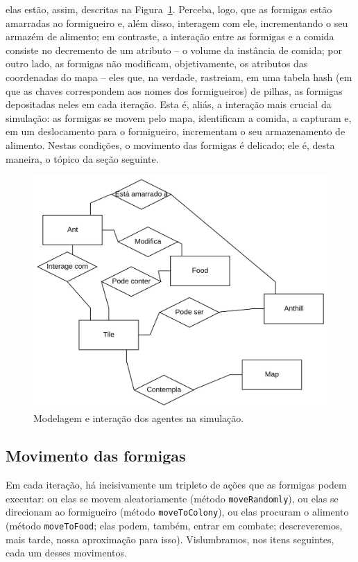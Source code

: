 \documentclass[12pt]{article}
\theoremstyle{definition}
\begin{document}
\noindent elas estão, assim, descritas na Figura~\ref{fig:siml}. Perceba, logo, que as formigas estão amarradas ao formigueiro e, além disso, interagem com ele, incrementando o seu armazém de alimento; em contraste, a interação entre as formigas e a comida consiste no decremento de um atributo -- o volume da instância de comida; por outro lado, as formigas não modificam, objetivamente, os atributos das coordenadas do mapa -- eles que, na verdade, rastreiam, em uma tabela hash (em que as chaves correspondem aos nomes dos formigueiros) de pilhas, as formigas depositadas neles em cada iteração. Esta é, aliás, a interação mais crucial da simulação: as formigas se movem pelo mapa, identificam a comida, a capturam e, em um deslocamento para o formigueiro, incrementam o seu armazenamento de alimento. Nestas condições, o movimento das formigas é delicado; ele é, desta maneira, o tópico da seção seguinte. 

\begin{figure} 
	\centering 
	\includegraphics[width = \textwidth]{image.png} 
	\caption{Modelagem e interação dos agentes na simulação.} 
	\label{fig:siml} 
\end{figure} 

\subsection{Movimento das formigas} 

Em cada iteração, há incisivamente um tripleto de ações que as formigas podem executar: ou elas se movem aleatoriamente (método \texttt{moveRandomly}), ou elas se direcionam ao formigueiro (método \texttt{moveToColony}), ou elas procuram o alimento (método \texttt{moveToFood}; elas podem, também, entrar em combate; descreveremos, mais tarde, nossa aproximação para isso). Vislumbramos, nos itens seguintes, cada um desses movimentos. 
\end{document}
